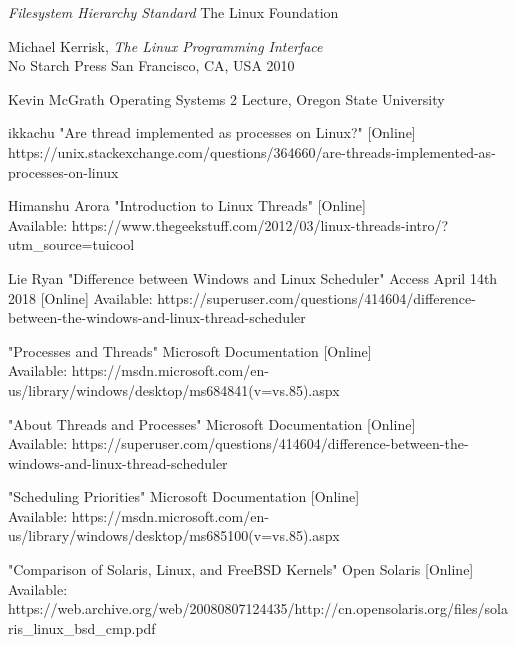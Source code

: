 \documentclass[letterpaper,10pt,notitlepage,fleqn]{article}
\begin{document}
\begin{thebibliography}{50}



    \textit{Filesystem Hierarchy Standard}  The Linux Foundation 

    Michael Kerrisk, \textit{The Linux Programming Interface} \\
        No Starch Press San Francisco, CA, USA 2010

    Kevin McGrath Operating Systems 2 Lecture, Oregon State University

    ikkachu "Are thread implemented as processes on Linux?" [Online] \\
    https://unix.stackexchange.com/questions/364660/are-threads-implemented-as-processes-on-linux

    Himanshu Arora "Introduction to Linux Threads" [Online]\\
    Available: https://www.thegeekstuff.com/2012/03/linux-threads-intro/?utm\_source=tuicool

    Lie Ryan "Difference between Windows and Linux Scheduler" Access April 14th 2018 [Online]
        Available: https://superuser.com/questions/414604/difference-between-the-windows-and-linux-thread-scheduler 



    "Processes and Threads"
        Microsoft Documentation [Online] \\Available:
        https://msdn.microsoft.com/en-us/library/windows/desktop/ms684841(v=vs.85).aspx

    "About Threads and Processes" Microsoft Documentation [Online] \\Available:
    https://superuser.com/questions/414604/difference-between-the-windows-and-linux-thread-scheduler


    "Scheduling Priorities"
        Microsoft Documentation [Online] \\Available:
https://msdn.microsoft.com/en-us/library/windows/desktop/ms685100(v=vs.85).aspx


    "Comparison of Solaris, Linux, and FreeBSD Kernels" Open Solaris [Online]\\
        Available: https://web.archive.org/web/20080807124435/http://cn.opensolaris.org/files/solaris\_linux\_bsd\_cmp.pdf


\end{thebibliography}
\end{document}
